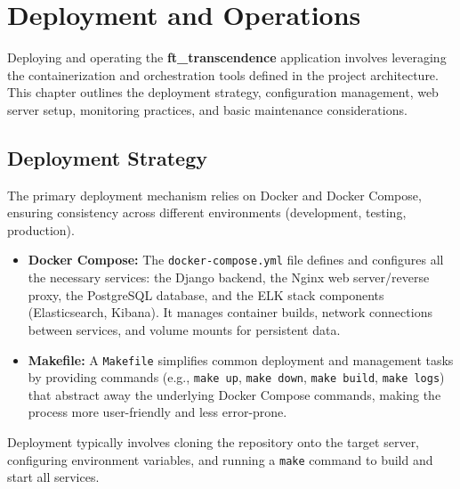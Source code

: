 \chapter{Deployment and Operations}
\label{ch:deployment}

Deploying and operating the \textbf{ft\_transcendence} application involves leveraging the containerization and orchestration tools defined in the project architecture. This chapter outlines the deployment strategy, configuration management, web server setup, monitoring practices, and basic maintenance considerations.

\section{Deployment Strategy}
\label{sec:deployment_strategy}
The primary deployment mechanism relies on Docker and Docker Compose, ensuring consistency across different environments (development, testing, production).
\begin{itemize}
    \item \textbf{Docker Compose:} The \texttt{docker-compose.yml} file defines and configures all the necessary services: the Django backend, the Nginx web server/reverse proxy, the PostgreSQL database, and the ELK stack components (Elasticsearch, Kibana). It manages container builds, network connections between services, and volume mounts for persistent data.
    \item \textbf{Makefile:} A \texttt{Makefile} simplifies common deployment and management tasks by providing commands (e.g., \texttt{make up}, \texttt{make down}, \texttt{make build}, \texttt{make logs}) that abstract away the underlying Docker Compose commands, making the process more user-friendly and less error-prone.
\end{itemize}
Deployment typically involves cloning the repository onto the target server, configuring environment variables, and running a \texttt{make} command to build and start all services.

